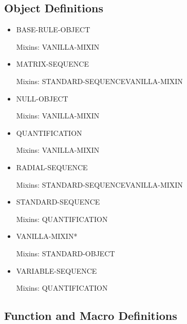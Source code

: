 \documentclass [11pt]{book}
\begin{document}
\subsection{Object Definitions}

\label{subsec:objectdefinitions}



\begin{itemize}

\item {}BASE-RULE-OBJECT

Mixins: VANILLA-MIXIN



\item {}MATRIX-SEQUENCE

Mixins: STANDARD-SEQUENCEVANILLA-MIXIN



\item {}NULL-OBJECT

Mixins: VANILLA-MIXIN



\item {}QUANTIFICATION

Mixins: VANILLA-MIXIN



\item {}RADIAL-SEQUENCE

Mixins: STANDARD-SEQUENCEVANILLA-MIXIN



\item {}STANDARD-SEQUENCE

Mixins: QUANTIFICATION



\item {}VANILLA-MIXIN*

Mixins: STANDARD-OBJECT



\item {}VARIABLE-SEQUENCE

Mixins: QUANTIFICATION



\end{itemize}



\subsection{Function and Macro Definitions}
\end{document}
